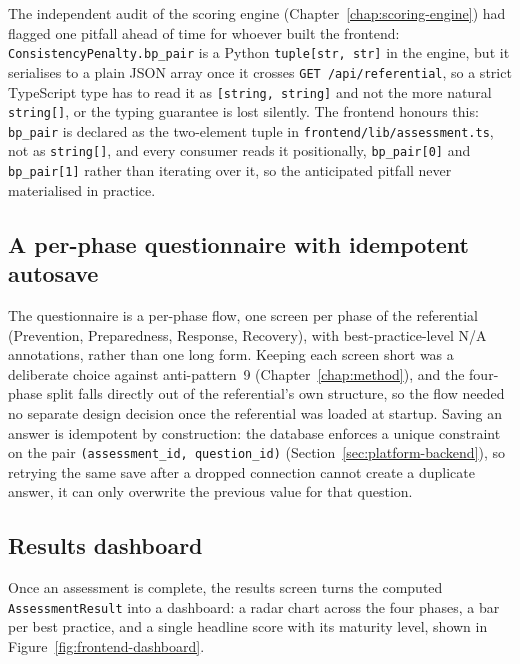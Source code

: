 The independent audit of the scoring engine (Chapter~\ref{chap:scoring-engine}) had flagged one pitfall ahead of time for whoever built the frontend: \texttt{Consistency\allowbreak Penalty.\allowbreak bp\_\allowbreak pair} is a Python \texttt{tuple[str, str]} in the engine, but it serialises to a plain JSON array once it crosses \texttt{GET /\allowbreak api/\allowbreak referential}, so a strict TypeScript type has to read it as \texttt{[string, string]} and not the more natural \texttt{string[]}, or the typing guarantee is lost silently. The frontend honours this: \texttt{bp\_\allowbreak pair} is declared as the two-element tuple in \texttt{frontend/\allowbreak lib/\allowbreak assessment.\allowbreak ts}, not as \texttt{string[]}, and every consumer reads it positionally, \texttt{bp\_\allowbreak pair[0]} and \texttt{bp\_\allowbreak pair[1]} rather than iterating over it, so the anticipated pitfall never materialised in practice.

\subsection{A per-phase questionnaire with idempotent autosave}

The questionnaire is a per-phase flow, one screen per phase of the referential (Prevention, Preparedness, Response, Recovery), with best-practice-level N/A annotations, rather than one long form. Keeping each screen short was a deliberate choice against anti-pattern~9 (Chapter~\ref{chap:method}), and the four-phase split falls directly out of the referential's own structure, so the flow needed no separate design decision once the referential was loaded at startup. Saving an answer is idempotent by construction: the database enforces a unique constraint on the pair \texttt{(assessment\_\allowbreak id, question\_\allowbreak id)} (Section~\ref{sec:platform-backend}), so retrying the same save after a dropped connection cannot create a duplicate answer, it can only overwrite the previous value for that question.

\subsection{Results dashboard}

Once an assessment is complete, the results screen turns the computed \texttt{Assessment\allowbreak Result} into a dashboard: a radar chart across the four phases, a bar per best practice, and a single headline score with its maturity level, shown in Figure~\ref{fig:frontend-dashboard}.


